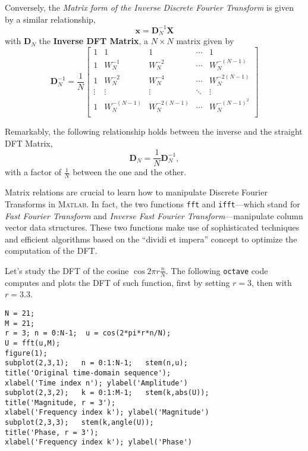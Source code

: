 \documentclass[\documentfontsize, twocolumn]{\classname}
\begin{document}
Conversely, the \emph{Matrix form of the Inverse Discrete Fourier Transform} is given by a similar relationship,
\begin{equation}\label{eqn:idftMatrixForm}
    \bm{x} = \bm{D}^{-1}_N\bm{X}
\end{equation}
with $\bm D_N$ the \textbf{Inverse DFT Matrix}, a $N \times N$ matrix given by
\begin{equation}\label{eqn:idftMatrixDn}
    \bm D^{-1}_N = \frac 1 N\begin{bmatrix}
        1 & 1 & 1 & \cdots & 1 \\
        1 & W_N^{-1} & W_N^{-2} & \cdots & W_N^{-(N-1)} \\
        1 & W_N^{-2} & W_N^{-4} & \cdots & W_N^{-2(N-1)} \\
        \vdots & \vdots & \vdots & \ddots & \vdots \\
        1 & W_N^{-(N-1)} & W_N^{-2(N-1)} & \cdots & W_N^{-(N-1)^2} \\
    \end{bmatrix}
\end{equation}

Remarkably, the following relationship holds between the inverse and the straight DFT Matrix,
\[
    \bm D_N = \frac 1 N \bm D^{-1}_N,
\]
with a factor of $\frac 1 N$ between the one and the other.

Matrix relations are crucial to learn how to manipulate Discrete Fourier Transforms in \textsc{Matlab}. In fact, the two functions \texttt{fft} and \texttt{ifft}---which stand for \emph{Fast Fourier Transform} and \emph{Inverse Fast Fourier Transform}---manipulate column vector data structures. These two functions make use of sophisticated techniques and efficient algorithms based on the ``dividi et impera'' concept to optimize the computation of the DFT.

Let's study the DFT of the cosine $\cos{2\pi r \frac{n}{N}}$. The following \texttt{octave} code computes and plots the DFT of such function, first by setting $r=3$, then with $r=3.3$.
\begin{verbatim}
N = 21;
M = 21;
r = 3; n = 0:N-1;  u = cos(2*pi*r*n/N);
U = fft(u,M);
figure(1);
subplot(2,3,1);   n = 0:1:N-1;   stem(n,u);
title('Original time-domain sequence'); 
xlabel('Time index n'); ylabel('Amplitude')
subplot(2,3,2);   k = 0:1:M-1;   stem(k,abs(U));
title('Magnitude, r = 3'); 
xlabel('Frequency index k'); ylabel('Magnitude')
subplot(2,3,3);   stem(k,angle(U));
title('Phase, r = 3'); 
xlabel('Frequency index k'); ylabel('Phase')
\end{verbatim}
\end{document}
